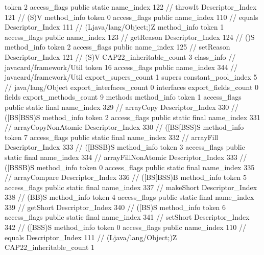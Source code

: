 {{{{{					token	2
					access_flags	public static
					name_index	122		// throwIt
					Descriptor_Index	121		// (S)V
				}
				method_info {
					token	0
					access_flags	public
					name_index	110		// equals
					Descriptor_Index	111		// (Ljava/lang/Object;)Z
				}
				method_info {
					token	1
					access_flags	public
					name_index	123		// getReason
					Descriptor_Index	124		// ()S
				}
				method_info {
					token	2
					access_flags	public
					name_index	125		// setReason
					Descriptor_Index	121		// (S)V
				}
			}
			CAP22_inheritable_count	3
		}
		class_info {		// javacard/framework/Util
			token	16
			access_flags	public
			name_index	344		// javacard/framework/Util
			export_supers_count	1
			supers {
				constant_pool_index	5		// java/lang/Object
			}
			export_interfaces_count	0
			interfaces {
			}
			export_fields_count	0
			fields {
			}
			export_methods_count	9
			methods {
				method_info {
					token	1
					access_flags	public static final
					name_index	329		// arrayCopy
					Descriptor_Index	330		// ([BS[BSS)S
				}
				method_info {
					token	2
					access_flags	public static final
					name_index	331		// arrayCopyNonAtomic
					Descriptor_Index	330		// ([BS[BSS)S
				}
				method_info {
					token	7
					access_flags	public static final
					name_index	332		// arrayFill
					Descriptor_Index	333		// ([BSSB)S
				}
				method_info {
					token	3
					access_flags	public static final
					name_index	334		// arrayFillNonAtomic
					Descriptor_Index	333		// ([BSSB)S
				}
				method_info {
					token	0
					access_flags	public static final
					name_index	335		// arrayCompare
					Descriptor_Index	336		// ([BS[BSS)B
				}
				method_info {
					token	5
					access_flags	public static final
					name_index	337		// makeShort
					Descriptor_Index	338		// (BB)S
				}
				method_info {
					token	4
					access_flags	public static final
					name_index	339		// getShort
					Descriptor_Index	340		// ([BS)S
				}
				method_info {
					token	6
					access_flags	public static final
					name_index	341		// setShort
					Descriptor_Index	342		// ([BSS)S
				}
				method_info {
					token	0
					access_flags	public
					name_index	110		// equals
					Descriptor_Index	111		// (Ljava/lang/Object;)Z
				}
			}
			CAP22_inheritable_count	1
		}
	}
}
